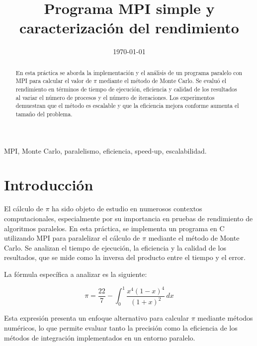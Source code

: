 \documentclass[conference, a4paper]{IEEEtran}
\begin{document}
\title{Programa MPI simple y caracterización del rendimiento}
\author{
}
\date{\today}

\maketitle

\begin{abstract}
En esta práctica se aborda la implementación y el análisis de un programa paralelo con MPI para calcular el valor de \(\pi\) mediante el método de Monte Carlo. Se evaluó el rendimiento en términos de tiempo de ejecución, eficiencia y calidad de los resultados al variar el número de procesos y el número de iteraciones. Los experimentos demuestran que el método es escalable y que la eficiencia mejora conforme aumenta el tamaño del problema.
\end{abstract}

\begin{IEEEkeywords}
MPI, Monte Carlo, paralelismo, eficiencia, speed-up, escalabilidad.
\end{IEEEkeywords}

\section{Introducción}
El cálculo de \(\pi\) ha sido objeto de estudio en numerosos contextos computacionales, especialmente por su importancia en pruebas de rendimiento de algoritmos paralelos. En esta práctica, se implementa un programa en C utilizando MPI para paralelizar el cálculo de \(\pi\) mediante el método de Monte Carlo. Se analizan el tiempo de ejecución, la eficiencia y la calidad de los resultados, que se mide como la inversa del producto entre el tiempo y el error.

La fórmula específica a analizar es la siguiente:

\begin{equation}
\pi = \frac{22}{7} - \int_{0}^{1} \frac{x^4 (1 - x)^4}{(1 + x)^2} \, dx
\end{equation}

Esta expresión presenta un enfoque alternativo para calcular \(\pi\) mediante métodos numéricos, lo que permite evaluar tanto la precisión como la eficiencia de los métodos de integración implementados en un entorno paralelo.
\end{document}
